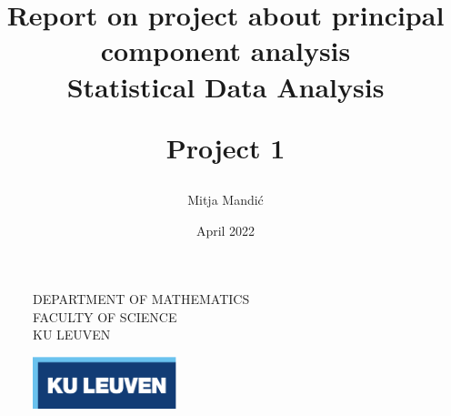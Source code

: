 \documentclass[12pt]{article}
\title{\vspace*{40.0mm}
  \bf Report on project about principal component analysis
         \vspace*{20.0mm} \\
  \Large\bf Statistical Data Analysis 
  
 
  
  Project 1 \vspace*{20.0mm}
  \vspace*{40.0mm}}
\author{Mitja Mandić}
\date{ April 2022}
\makeatletter
\def\cleardoublepage{\clearpage\if@twoside \ifodd\c@page\else%
\hbox{}%
\thispagestyle{empty}%
\clearpage%
\if@twocolumn\hbox{}\clearpage\fi\fi\fi}
\makeatother
\begin{document}
\begin{figure}
  \parbox[t]{125mm}{
    \vspace*{6mm}
    \scriptsize\sf           DEPARTMENT OF MATHEMATICS \\
    \scriptsize\sf           FACULTY OF SCIENCE\\
    \scriptsize\sf           KU LEUVEN}
  \parbox[t]{40mm}{
    \begin{flushright}
      \includegraphics[height=15mm]{../images/logo.eps.pdf}
    \end{flushright}}
\end{figure}

\maketitle
\thispagestyle{empty}
\raggedbottom

\cleardoublepage
{}
\setcounter{tocdepth}{2}
{}
\end{document}
